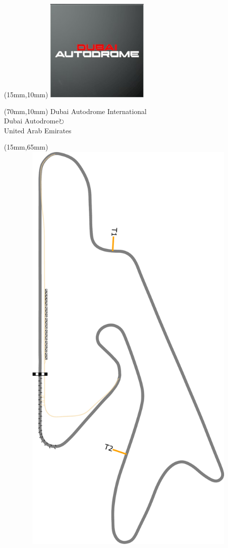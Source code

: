 \null\newpage
\begin{textblock*}{50mm}(15mm,10mm)%
\includegraphics[width=50mm]{LG/2015-05-20_00081.png}
\end{textblock*}
\begin{textblock*}{130mm}(70mm,10mm)%
{\fontsize{20}{20}\selectfont Dubai Autodrome International\\}
{\fontsize{16}{16}\selectfont Dubai Autodrome\hfill \Large$\circlearrowright$\\}
{\fontsize{12}{12}\selectfont United Arab Emirates\\}
\end{textblock*}
\begin{textblock*}{185mm}(15mm,65mm)%
\centering
\mbox{\includegraphics[width=185mm,height=210mm,keepaspectratio]{PT/DUAUIN.pdf}}
\end{textblock*}

